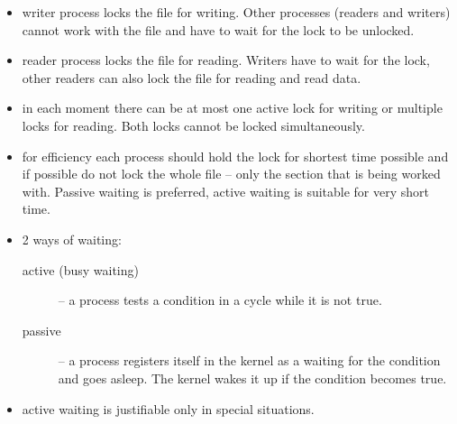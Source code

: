 
\begin{slide}
\begin{itemize}
\item writer process locks the file for writing. Other processes
(readers and writers) cannot work with the file and have to wait for the lock
to be unlocked.
\item reader process locks the file for reading. Writers have to wait
for the lock, other readers can also lock the file for reading and read data.
\item in each moment there can be at most one active lock for writing or
multiple locks for reading. Both locks cannot be locked simultaneously.
\item for efficiency each process should hold the lock for shortest time
possible and if possible do not lock the whole file -- only the section that
is being worked with. Passive waiting is preferred, active waiting is
suitable for very short time.
\end{itemize}
\end{slide}

\begin{itemize}
\item 2 ways of waiting:
\begin{description}
\item[active (busy waiting)] -- a process tests a condition in a cycle while
it is not true.
\item[passive] -- a process registers itself in the kernel as a waiting for
the condition and goes asleep. The kernel wakes it up if the condition becomes
true.
\end{description}
\item \label{BUSYWAITING} active waiting is justifiable only in special
situations.
\end{itemize}



